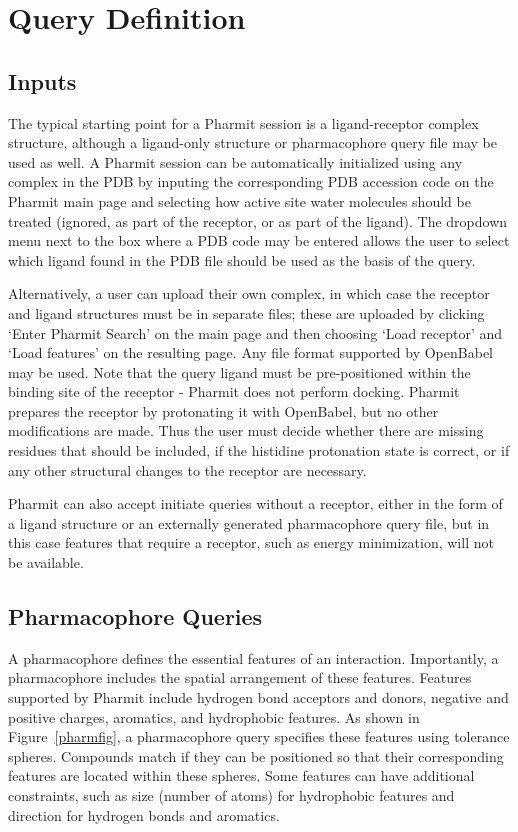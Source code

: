 \section{Query Definition}


\subsection{Inputs}

The typical starting point for a Pharmit session is a ligand-receptor complex structure, although a ligand-only structure or pharmacophore query file may be used as well. A Pharmit session can be automatically initialized using any complex in the PDB by inputing the corresponding PDB accession code on the Pharmit main page and selecting how active site water molecules should be treated (ignored, as part of the receptor, or as part of the ligand).  The dropdown menu next to the box where a PDB code may be entered allows the user to select which ligand found in the PDB file should be used as the basis of the query.  

Alternatively, a user can upload their own complex, in which case the receptor and ligand structures must be in separate files; these are uploaded by clicking `Enter Pharmit Search' on the main page and then choosing `Load receptor' and `Load features' on the resulting page. Any file format supported by OpenBabel may be used. 
 Note that the query ligand must be pre-positioned within the binding site of the receptor - Pharmit does not perform docking.
Pharmit prepares the receptor by protonating it with OpenBabel, but no other modifications are made. Thus the user must decide whether there are missing residues that should be included, if the histidine protonation state is correct, or if any other structural changes to the receptor are necessary.  

Pharmit can also accept initiate queries without a receptor, either in the form of a ligand structure or an externally generated pharmacophore query file, but in this case features that require a receptor, such as energy minimization, will not be available.

\subsection{Pharmacophore Queries}
A pharmacophore \cite{Koes_2015rev,Yang_2010,Leach_2010} defines the essential features of an interaction. Importantly, a pharmacophore includes the spatial arrangement of these features. 
Features supported by Pharmit include hydrogen bond acceptors and donors,  negative and positive charges, aromatics, and hydrophobic features.
As shown in Figure~\ref{pharmfig}, a pharmacophore query specifies these features using tolerance spheres.  Compounds match if they can be positioned so that their corresponding features are located within these spheres. Some features can have additional constraints, such as size (number of atoms) for hydrophobic features and direction for hydrogen bonds and aromatics.

